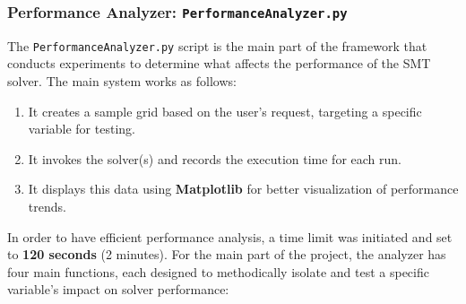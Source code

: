\documentclass[12pt, a4paper, oneside]{report} %
\begin{document}
\subsubsection{Performance Analyzer: \texttt{PerformanceAnalyzer.py}}

The \texttt{PerformanceAnalyzer.py} script is the main part of the framework that conducts experiments to determine what affects the performance of the SMT solver. The main system works as follows:
\begin{enumerate}
    \item It creates a sample grid based on the user's request, targeting a specific variable for testing.
    \item It invokes the solver(s) and records the execution time for each run.
    \item It displays this data using \textbf{Matplotlib} for better visualization of performance trends.
\end{enumerate}

In order to have efficient performance analysis, a time limit was initiated and set to \textbf{120 seconds} (2 minutes). For the main part of the project, the analyzer has four main functions, each designed to methodically isolate and test a specific variable's impact on solver performance:
\end{document}
